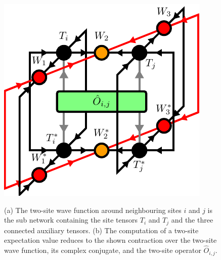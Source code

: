 \begin{figure}
	\centering
	\subcaptionbox{\label{fig:YB_isoTPS_twosite_expectation_value_environment}}
	{%
		\usebox{\largestimage}
	}
	\quad\quad
	\subcaptionbox{\label{fig:YB_isoTPS_twosite_expectation_value_computation}}
	{%
		\raisebox{\dimexpr.5\ht\largestimage-.5\height}
		{%
			\includegraphics[scale=1.0]{figures/tikz/YB_isoTPS/two_site_expectation_value/two_site_expectation_value_b.pdf}
		}
	}
	\caption{(a) The two-site wave function around neighbouring sites $i$ and $j$ is the sub network containing the site tensors $T_i$ and $T_j$ and the three connected auxiliary tensors. (b) The computation of a two-site expectation value reduces to the shown contraction over the two-site wave function, its complex conjugate, and the two-site operator $\hat{O}_{i,j}$.}
	\label{fig:YB_isoTPS_twosite_expectation_value}
\end{figure}
